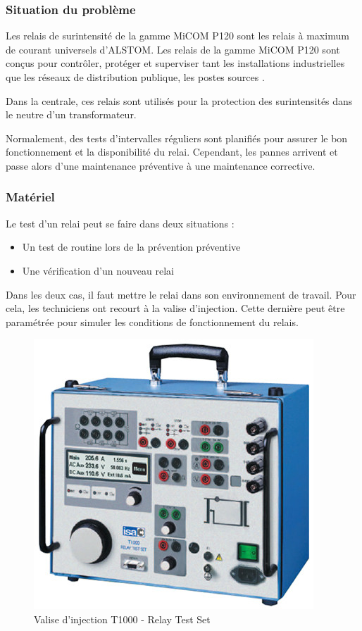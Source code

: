 \subsubsection{Situation du problème}
Les relais de surintensité de la gamme  MiCOM P120  sont les relais à maximum de courant universels d'ALSTOM. Les relais de la gamme MiCOM P120 sont conçus pour contrôler, protéger et superviser tant les installations industrielles que les réseaux de distribution publique, les postes sources \cite{micom}.

Dans la centrale, ces relais sont utilisés pour la  protection des surintensités dans le neutre d'un transformateur.

Normalement, des tests d'intervalles réguliers sont planifiés pour assurer le bon fonctionnement et la disponibilité du relai. Cependant, les pannes arrivent et passe alors  d'une maintenance préventive à une maintenance corrective.
\pagebreak
\subsubsection{Matériel}
Le test d'un relai peut se faire dans deux situations :

\begin{itemize}
\item Un test de routine lors de la prévention préventive
\item Une vérification d'un nouveau relai
\end{itemize}
Dans les deux cas, il faut mettre le relai dans son   environnement de travail.
Pour cela, les techniciens ont recourt à la valise d'injection.
Cette dernière  peut être paramétrée pour simuler les conditions de fonctionnement du relais. 

\begin{figure}[hbtp]
\centering
\includegraphics[scale=0.4]{./Figures/T1000.jpg}
\caption{Valise d'injection T1000 - Relay Test Set}
\end{figure}


